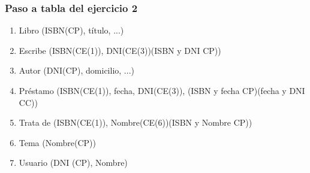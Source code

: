 \subsubsection*{Paso a tabla del ejercicio 2}

\begin{enumerate}
    \item Libro (ISBN(CP), título, ...)
    \item Escribe (ISBN(CE(1)), DNI(CE(3))(ISBN y DNI CP))
    \item Autor (DNI(CP), domicilio, ...)
    \item Préstamo (ISBN(CE(1)), fecha, DNI(CE(3)), (ISBN y fecha CP)(fecha y DNI CC))
    \item Trata de (ISBN(CE(1)), Nombre(CE(6))(ISBN y Nombre CP))
    \item Tema (Nombre(CP))
    \item Usuario (DNI (CP), Nombre)
\end{enumerate}

